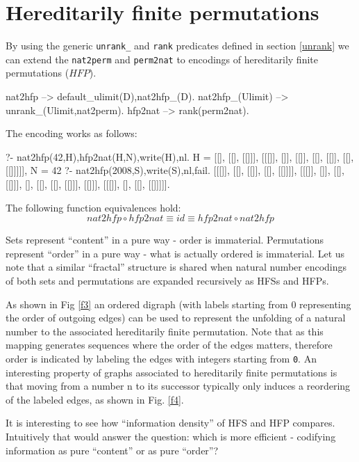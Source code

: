 \documentclass[]{INCLUDES/llncs}
\begin{document}
\section{Hereditarily finite permutations} \label{hfp}

By using the generic {\tt unrank\_} and {\tt rank} predicates defined 
in section \ref{unrank} we can extend the {\tt nat2perm} and {\tt perm2nat} to
encodings of hereditarily finite permutations ($HFP$).
\begin{code}
nat2hfp --> default_ulimit(D),nat2hfp_(D).   
nat2hfp_(Ulimit) --> unrank_(Ulimit,nat2perm).
hfp2nat --> rank(perm2nat).
\end{code}
The encoding works  as follows:
\begin{codex}
?- nat2hfp(42,H),hfp2nat(H,N),write(H),nl.
H = [[], [[], [[]]], [[[]], []], [[]], [[], [[]], [[], [[]]]]],
N = 42
?- nat2hfp(2008,S),write(S),nl,fail.
[[[]], [[], [[]], [[], [[]]]], [[[]], []], [[], [[]]], [], 
       [[], [[], [[]]], [[]]], [[[]], [], [[], [[]]]]].
\end{codex}
\begin{prop}
The following function equivalences hold:
\begin{equation}
{nat2hfp} \circ {hfp2nat} \equiv id \equiv {hfp2nat} \circ {nat2hfp}
\end{equation}
\end{prop}

Sets represent ``content'' in a pure way - order is immaterial. Permutations
represent ``order'' in a pure way - what is actually ordered is immaterial.
Let us note that a similar ``fractal'' structure is shared when natural
number encodings of both sets and permutations are expanded recursively
as HFSs and HFPs.

As shown in Fig \ref{f3} an ordered digraph (with labels starting from 0
representing the order of outgoing edges) can be used to represent the unfolding
of a natural number to the associated hereditarily finite permutation.
Note that as this mapping generates
sequences where the order of the edges matters, therefore order is
indicated by labeling the edges with integers starting from {\tt 0}.
An interesting property of graphs associated to hereditarily finite permutations
is that moving from a number n to its successor typically only induces a
reordering of the labeled edges, as shown in Fig. \ref{f4}.

It is interesting to see how ``information density'' of HFS and HFP compares.
Intuitively that would answer the question: which is more efficient -
codifying information as pure ``content'' or as pure ``order''?
 
\end{document}
